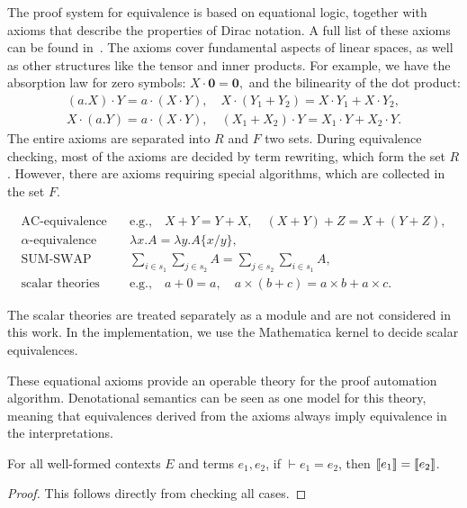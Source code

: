 The proof system for equivalence is based on equational logic, together with axioms that describe the properties of Dirac notation. A full list of these axioms can be found in~. The axioms cover fundamental aspects of linear spaces, as well as other structures like the tensor and inner products. For example, we have the absorption law for zero symbols:
\(X \cdot \mathbf{0} = \mathbf{0},\)
and the bilinearity of the dot product:
\begin{align*}
(a.X) \cdot Y = a \cdot (X \cdot Y), \quad X \cdot (Y_1 + Y_2) = X \cdot Y_1 + X \cdot Y_2, \\
X \cdot (a.Y) = a \cdot (X \cdot Y), \quad (X_1 + X_2) \cdot Y = X_1 \cdot Y + X_2 \cdot Y.
\end{align*}
The entire axioms are separated into $R$ and $F$ two sets.
During equivalence checking, most of the axioms are decided by term rewriting, which form the set $R$. However, there are axioms requiring special algorithms, which are collected in the set $F$.
\begin{definition}
\label{def: axiom F}
\begin{align*}
    \text{AC-equivalence} &\quad \text{e.g.,} \quad X + Y = Y + X, \quad (X + Y) + Z = X + (Y + Z), \\
    \alpha\text{-equivalence} &\quad \lambda x . A = \lambda y . A\{x/y\}, \\
    \text{SUM-SWAP} &\quad \sum_{i \in s_1} \sum_{j \in s_2} A = \sum_{j \in s_2} \sum_{i \in s_1} A, \\
    \text{scalar theories} &\quad \text{e.g.,} \quad a + 0 = a, \quad a \times (b + c) = a \times b + a \times c.
\end{align*}
\end{definition}

The scalar theories are treated separately as a module and are not considered in this work. In the implementation, we use the Mathematica kernel to decide scalar equivalences.

These equational axioms provide an operable theory for the proof automation algorithm. Denotational semantics can be seen as one model for this theory, meaning that equivalences derived from the axioms always imply equivalence in the interpretations.
\begin{lemma}
    For all well-formed contexts \( E \) and terms \( e_1, e_2 \), if \( \vdash e_1 = e_2 \), then \( {\llbracket e_1 \rrbracket} = {\llbracket e_2 \rrbracket} \).
\end{lemma}
\begin{proof}
    This follows directly from checking all cases.
\end{proof}

